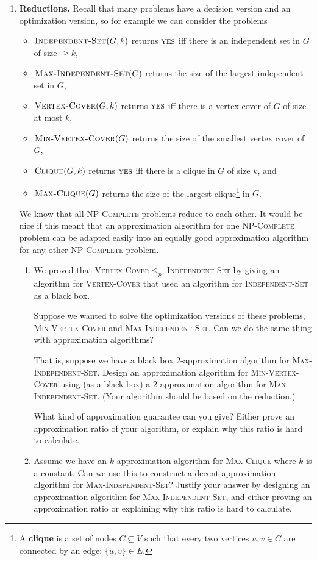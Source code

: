 \documentclass[11pt]{article}
\newcommand{\yes}{\textsc{yes}\xspace}
\newcommand{\prob}[1]{\textsc{#1}\xspace}
\newcommand{\vc}{\prob{Vertex-Cover}}
\newcommand{\vcopt}{\prob{Min-Vertex-Cover}}
\newcommand{\is}{\prob{Independent-Set}}
\newcommand{\isopt}{\prob{Max-Independent-Set}}
\newcommand{\clique}{\prob{Clique}}
\newcommand{\cliqueopt}{\prob{Max-Clique}}
\newcommand{\npcomplete}{\textsc{NP-Complete}\xspace}
\begin{document}
\begin{enumerate}
\item {\bf Reductions.}
  Recall that many problems have a decision version and an
  optimization version, so for example we can consider the problems
  \begin{itemize}
    \item $\is(G,k)$ returns $\yes$ iff there is an independent set in $G$ of
      size $\geq k$,
    \item $\isopt(G)$ returns the size of the largest independent set in
      $G$, 
    \item $\vc(G,k)$ returns $\yes$ iff there is a vertex cover of $G$ of size
      at most $k$, 
    \item $\vcopt(G)$ returns the size of the smallest vertex
      cover of $G$,
    \item $\clique(G,k)$ returns $\yes$ iff there is a clique in $G$
      of size $k$, and
    \item $\cliqueopt(G)$ returns the size of the largest
      clique\footnote{A {\bf clique} is a set of nodes $C \subseteq V$
        such that every two vertices $u, v \in C$ are connected by an
        edge: $\{u,v\} \in E$.} in $G$.
  \end{itemize}

  We know that all \npcomplete problems reduce to each other. It would
  be nice if this meant that an approximation algorithm for one
  \npcomplete problem can be adapted easily into an equally good
  approximation algorithm for any other \npcomplete problem.
  
  \begin{enumerate}
  \item We proved that \vc $\leq_p$ \is by giving an
    algorithm for \vc that used an algorithm for \is as a black box.

    Suppose we wanted to solve the optimization versions of these
    problems, \vcopt and \isopt.
    Can we do the same thing with approximation algorithms?

    That is, suppose we have a black box $2$-approximation algorithm
    for \isopt. 
    Design an approximation algorithm for \vcopt
    using (as a black box) a $2$-approximation algorithm for \isopt.
    (Your algorithm should be based on the reduction.)

    What kind of approximation guarantee can you give?
    Either prove an approximation ratio of your algorithm, or explain
    why this ratio is hard to calculate.

  \item Assume we have an $k$-approximation algorithm for \cliqueopt
    where $k$ is a constant.  Can we use this to
    construct a decent approximation algorithm for \isopt?
    Justify your answer by designing an
    approximation algorithm for \isopt, and either proving an
    approximation ratio or explaining why this ratio is hard to
    calculate.
  \end{enumerate}


\end{enumerate}
\end{document}
